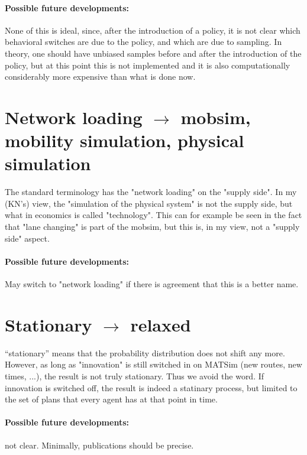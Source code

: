 \paragraph{Possible future developments:} None of this is  ideal,  since, after the introduction of a policy, it is not clear which   behavioral switches are due to the policy, and which are due to   sampling. In theory, one should have unbiased samples before and  after  the introduction of the policy, but at this point this is not   implemented and it is also computationally considerably more expensive   than what is done now.

\section{Network loading $\to$ mobsim, mobility simulation, physical simulation}


The standard terminology has the "network   loading" on the "supply  side". In my (KN's) view, the  "simulation of  the physical system" is  not the supply side, but what  in economics is  called "technology". This  can for example be  seen in the fact that  "lane changing" is part of the  mobsim, but this  is, in my view, not a  "supply side" aspect.

\paragraph{Possible future developments:} May switch to "network loading" if there is agreement that this is a better name.

\section{Stationary $\to$ relaxed}

``stationary'' means that the probability   distribution does not shift any  more. However, as long as  "innovation"  is still switched in on MATSim  (new routes, new times,  ...), the  result is not truly stationary. Thus  we avoid the  word. If innovation  is switched off, the result is indeed a   statinary process, but limited  to the set of plans that every agent has   at that point in time.

\paragraph{Possible future developments:} not clear. Minimally, publications should be precise.

